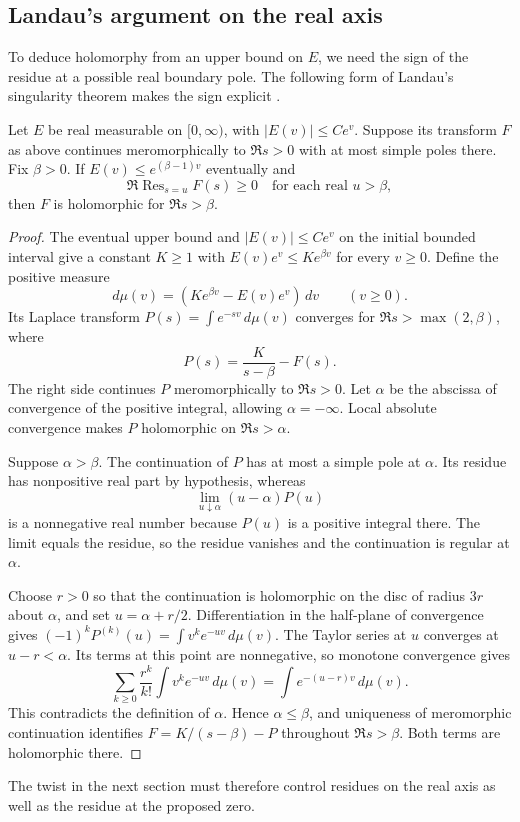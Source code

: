 \subsection{Landau's argument on the real axis}
To deduce holomorphy from an upper bound on \(E\), we need the sign of the
residue at a possible real boundary pole. The following form of Landau's
singularity theorem makes the sign explicit \cite[Lemma~15.1]{MV}\cite[Chapter~II, Theorem~5b]{widder}.

\begin{lemma}\label{lem:p1landau}
Let $E$ be real measurable on $[0,\infty)$, with $|E(v)|\le Ce^v$. Suppose its transform $F$ as above continues meromorphically to $\Re s>0$ with at most simple poles there. Fix $\beta>0$. If $E(v)\le e^{(\beta-1)v}$ eventually and
\[
 \Re\operatorname{Res}_{s=u}F(s)\ge0
 \quad\text{for each real }u>\beta,
\]
then $F$ is holomorphic for $\Re s>\beta$.
\end{lemma}
\begin{proof}
The eventual upper bound and \(|E(v)|\le Ce^v\) on the initial bounded
interval give a constant \(K\ge1\) with \(E(v)e^v\le K e^{\beta v}\) for
every \(v\ge0\). Define the positive measure
\[
 d\mu(v)=(K e^{\beta v}-E(v)e^v)\,dv
 \qquad(v\ge0).
\]
Its Laplace transform $P(s)=\int e^{-sv}\,d\mu(v)$ converges for $\Re s>\max(2,\beta)$, where
\[
 P(s)=\frac K{s-\beta}-F(s).
\]
The right side continues \(P\) meromorphically to \(\Re s>0\).
Let \(\alpha\) be the abscissa of convergence of the positive integral,
allowing \(\alpha=-\infty\). Local absolute convergence makes \(P\)
holomorphic on \(\Re s>\alpha\).

Suppose $\alpha>\beta$. The continuation of $P$ has at most a simple pole at $\alpha$. Its residue has nonpositive real part by hypothesis, whereas
\[
 \lim_{u\downarrow\alpha}(u-\alpha)P(u)
\]
is a nonnegative real number because $P(u)$ is a positive integral there. The limit equals the residue, so the residue vanishes and the continuation is regular at $\alpha$.

Choose \(r>0\) so that the continuation is holomorphic on the disc of
radius \(3r\) about \(\alpha\), and set \(u=\alpha+r/2\). Differentiation
in the half-plane of convergence gives
\((-1)^kP^{(k)}(u)=\int v^k e^{-uv}\,d\mu(v)\).
The Taylor series at \(u\) converges at \(u-r<\alpha\). Its terms at this
point are nonnegative, so monotone convergence gives
\[
 \sum_{k\ge0}\frac{r^k}{k!}\int v^k e^{-uv}\,d\mu(v)
   =\int e^{-(u-r)v}\,d\mu(v).
\]
This contradicts the definition of $\alpha$. Hence $\alpha\le\beta$, and uniqueness of meromorphic continuation identifies $F=K/(s-\beta)-P$ throughout $\Re s>\beta$. Both terms are holomorphic there.
\end{proof}
The twist in the next section must therefore control residues on the real
axis as well as the residue at the proposed zero.

